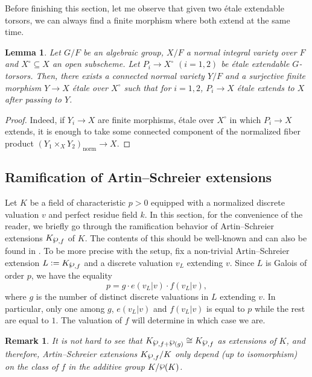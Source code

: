 \documentclass[a4paper,english,12pt]{amsart}
\newtheorem{lemma}[definition]{Lemma}
\newtheorem{remark}[definition]{Remark}
\numberwithin{equation}{section}
\newcommand{\defeq}{\vcentcolon=}
\renewcommand{\wp}{\ensuremath\raisebox{\depth}{$\mathchar"17D$}}
\renewcommand{\_}{\rule{0.25cm}{0.4pt}}
\begin{document}
Before finishing this section, let me observe that given two étale extendable torsors, we can always find a finite morphism where both extend at the same time.

\begin{lemma}\label{recobrimento comum}
    Let $G/F$ be an algebraic group, $X/F$ a normal integral variety over $F$ and $X^{\circ}\subseteq X$ an open subscheme. Let $P_{i}\to X^{\circ}$ $(i=1,2)$ be étale extendable $G$-torsors. Then, there exists a connected normal variety $Y/F$ and a surjective finite morphism $Y\to X$ étale over $X^{\circ}$ such that for $i=1,2$, $P_{i}\to X$ étale extends to $X$ after passing to $Y$.
\end{lemma}
\begin{proof}
    Indeed, if $Y_{i}\to X$ are finite morphisms, étale over $X^{\circ}$ in which $P_{i}\to X$ extends, it is enough to take some connected component of the normalized fiber product $(Y_{1}\times_{X} Y_{2})_{\text{norm}}\to X$.
\end{proof}

\subsection{Ramification of Artin--Schreier extensions}\label{1.3}
Let $K$ be a field of characteristic $p>0$ equipped with a normalized discrete valuation $v$ and perfect residue field $k$. In this section, for the convenience of the reader, we briefly go through the ramification behavior of Artin--Schreier extensions $K_{\wp,f}$ of $K$. The contents of this should be well-known and can also be found in \cite[Propositions 3.7.7 and 3.7.8]{Stichtenoth2008-ul}. To be more precise with the setup, fix a non-trivial Artin--Schreier extension $L\defeq K_{\wp,f}$ and a discrete valuation $v_{L}$ extending $v$. Since $L$ is Galois of order $p$, we have the equality
\[
p=g\cdot e(v_{L}|v)\cdot f(v_{L}|v),
\]
where $g$ is the number of distinct discrete valuations in $L$ extending $v$. In particular, only one among $g$, $e(v_{L}|v)$ and $f(v_{L}|v)$ is equal to $p$ while the rest are equal to $1$. The valuation of $f$ will determine in which case we are.

\begin{remark}
It is not hard to see that $K_{\wp, f+\wp(g)}\cong K_{\wp, f}$ as extensions of $K$, and therefore, Artin--Schreier extensions $K_{\wp, f}/K$ only depend (up to isomorphism) on the class of $f$ in the additive group $K/\wp(K)$.
\end{remark}
\end{document}
